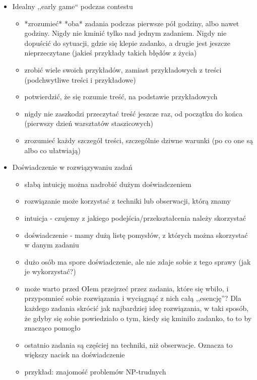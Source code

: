 \documentclass{article}
\begin{document}
\begin{itemize}
    \item Idealny ,,early game`` podczas contestu
    \begin{itemize}
        \item *zrozumieć* *oba* zadania podczas pierwsze pół godziny, albo nawet godziny. Nigdy nie kminić tylko nad jednym zadaniem. Nigdy nie dopuścić do sytuacji, gdzie się klepie zadanko, a drugie jest jeszcze nieprzeczytane (jakieś przykłady takich błędów z życia)
        \item zrobić wiele swoich przykładów, zamiast przykładowych z treści (podchwytliwe treści i przykładowe)
        \item potwierdzić, że się rozumie treść, na podstawie przykładowych
        \item nigdy nie zaszkodzi przeczytać treść jeszcze raz, od początku do końca (pierwszy dzień warsztatów staszicowych)
        \item zrozumieć każdy szczegół treści, szczególnie dziwne warunki (po co one są albo co ułatwiają)
    \end{itemize}
    
    \item Doświadczenie w rozwiązywaniu zadań
    \begin{itemize}
        \item słabą intuicję można nadrobić dużym doświadczeniem
        \item rozwiązanie może korzystać z techniki lub obserwacji, którą znamy
        \item intuicja - czujemy z jakiego podejścia/przekształcenia należy skorzystać
        \item doświadczenie - mamy dużą listę pomysłów, z których można skorzystać w danym zadaniu
        \item dużo osób ma spore doświadczenie, ale nie zdaje sobie z tego sprawy (jak je wykorzystać?)
        \item może warto przed OIem przejrzeć przez zadania, które się wbiło, i przypomnieć sobie rozwiązania i wyciągnąć z nich całą ,,esencję''? Dla każdego zadania skrócić jak najbardziej ideę rozwiązania, w taki sposób, że gdyby się sobie powiedziało o tym, kiedy się kminiło zadanko, to to by znacząco pomogło
        \item ostatnio zadania są częściej na techniki, niż obserwacje. Oznacza to większy nacisk na doświadczenie
        \item przykład: znajomość problemów NP-trudnych
    \end{itemize}
    

\end{itemize}
\end{document}
